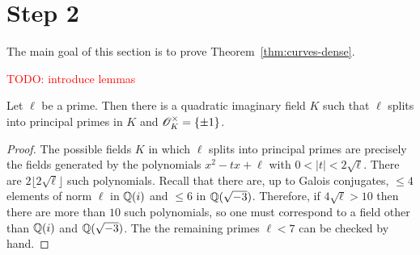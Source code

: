 \documentclass{amsart}
\begin{document}


\section{Step 2}
\label{sec:step-2}

The main goal of this section is to prove Theorem~\ref{thm:curves-dense}.

\textcolor{red}{TODO: introduce lemmas}

\begin{lemma}\label{lem:silly}
  Let $\ell$ be a prime. Then there is a quadratic imaginary field $K$ such that $\ell$ splits into principal primes in $K$ and $\mathscr{O}_K^\times = \{\pm 1\}$.
\end{lemma}
\begin{proof}
  The possible fields $K$ in which $\ell$ splits into principal primes are precisely the fields generated by the polynomials $x^2 - tx + \ell$ with $0 < |t| < 2\sqrt{\ell}$. There are $2\lfloor 2\sqrt{\ell} \rfloor$ such polynomials. Recall that there are, up to Galois conjugates, $\leq 4$ elements of norm $\ell$ in $\mathbb{Q}(i)$ and $\leq 6$ in $\mathbb{Q}(\sqrt{-3})$. Therefore, if $4\sqrt{\ell} > 10$ then there are more than $10$ such polynomials, so one must correspond to a field other than $\mathbb{Q}(i)$ and $\mathbb{Q}(\sqrt{-3})$. The the remaining primes $\ell < 7$ can be checked by hand.
\end{proof}
\end{document}
